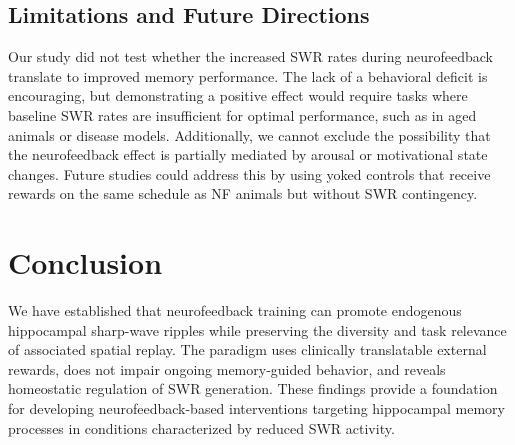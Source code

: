 \documentclass[11pt]{article}
\begin{document}
\subsection{Limitations and Future Directions}

Our study did not test whether the increased SWR rates during neurofeedback translate to improved memory performance. The lack of a behavioral deficit is encouraging, but demonstrating a positive effect would require tasks where baseline SWR rates are insufficient for optimal performance, such as in aged animals or disease models. Additionally, we cannot exclude the possibility that the neurofeedback effect is partially mediated by arousal or motivational state changes. Future studies could address this by using yoked controls that receive rewards on the same schedule as NF animals but without SWR contingency.

\section{Conclusion}

We have established that neurofeedback training can promote endogenous hippocampal sharp-wave ripples while preserving the diversity and task relevance of associated spatial replay. The paradigm uses clinically translatable external rewards, does not impair ongoing memory-guided behavior, and reveals homeostatic regulation of SWR generation. These findings provide a foundation for developing neurofeedback-based interventions targeting hippocampal memory processes in conditions characterized by reduced SWR activity.



\end{document}
